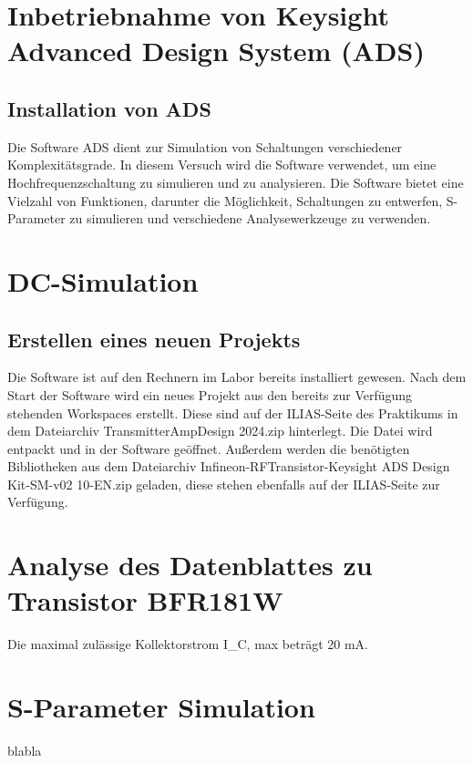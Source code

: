 
\section{Inbetriebnahme von Keysight Advanced Design System (ADS)}
\subsection{Installation von ADS}
Die Software \ac{ADS} dient zur Simulation von Schaltungen verschiedener Komplexitätsgrade. In diesem Versuch wird die Software verwendet, um eine Hochfrequenzschaltung zu simulieren und zu analysieren. Die Software bietet eine Vielzahl von Funktionen, darunter die Möglichkeit, Schaltungen zu entwerfen, S-Parameter zu simulieren und verschiedene Analysewerkzeuge zu verwenden.
\section{DC-Simulation}
\subsection{Erstellen eines neuen Projekts}
Die Software ist auf den Rechnern im Labor bereits installiert gewesen. Nach dem Start der Software wird ein neues Projekt aus den bereits zur Verfügung stehenden Workspaces erstellt. Diese sind auf der ILIAS-Seite des Praktikums in dem Dateiarchiv TransmitterAmpDesign 2024.zip hinterlegt. Die Datei wird entpackt und in der Software geöffnet. Außerdem werden die benötigten Bibliotheken aus dem Dateiarchiv Infineon-RFTransistor-Keysight ADS Design Kit-SM-v02 10-EN.zip geladen, diese stehen ebenfalls auf der ILIAS-Seite zur Verfügung.
\section{Analyse des Datenblattes zu Transistor BFR181W}
Die maximal zulässige Kollektorstrom I_C, max beträgt 20 mA.
\section{S-Parameter Simulation}

blabla
\clearpage
